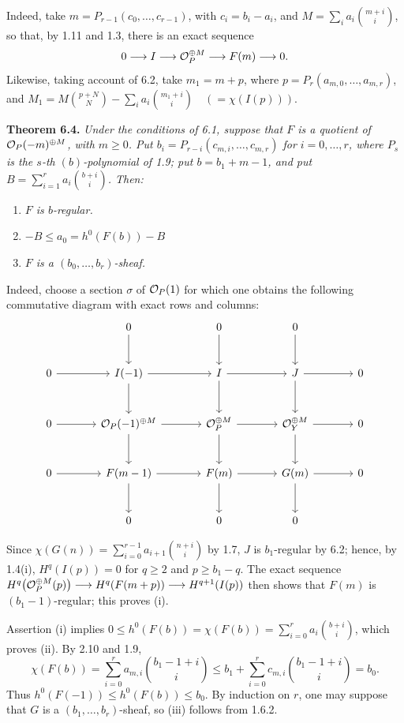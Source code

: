 Indeed, take $m=P_{r-1}(c_0,\ldots,c_{r-1})$, with $c_i=b_i-a_i$,
and $M=\sum_i a_i\binom{m+i}{i}$, so that, by 1.11 and 1.3, there is
an exact sequence
\[
  0\longrightarrow I\longrightarrow\mathcal O_P^{\oplus M}
  \longrightarrow F(m)\longrightarrow0.
\]
Likewise, taking account of 6.2, take $m_1=m+p$, where
$p=P_r(a_{m,0},\ldots,a_{m,r})$, and
$M_1=M\binom{p+N}{N}-\sum_i a_i\binom{m_1+i}{i}
\quad(=\chi(I(p)))$.

\textbf{Theorem 6.4.} \emph{Under the conditions of 6.1, suppose that
$F$ is a quotient of $\mathcal O_P(-m)^{\oplus M}$, with $m\geq0$. Put
$b_i=P_{r-i}(c_{m,i},\ldots,c_{m,r})$ for $i=0,\ldots,r$, where $P_s$
is the $s$-th $(b)$-polynomial of 1.9; put $b=b_1+m-1$, and put
$B=\sum_{i=1}^{r}a_i\binom{b+i}{i}$. Then:}
\begin{enumerate}[label=(\roman*)]
\item \emph{$F$ is $b$-regular.}
\item \emph{$-B\leq a_0=h^0(F(b))-B$}
\item \emph{$F$ is a $(b_0,\ldots,b_r)$-sheaf.}
\end{enumerate}

Indeed, choose a section $\sigma$ of $\mathcal O_P(1)$ for which one obtains the following commutative diagram with exact rows and columns:
\[
\begin{tikzcd}[column sep=large,row sep=large]
&0 \arrow[d]&0 \arrow[d]&0 \arrow[d]&\\
0 \arrow[r]&I(-1) \arrow[r] \arrow[d]&I \arrow[r] \arrow[d]&J \arrow[r] \arrow[d]&0\\
0 \arrow[r]&\cO_P(-1)^{\oplus M} \arrow[r] \arrow[d]&\cO_P^{\oplus M} \arrow[r] \arrow[d]&\cO_Y^{\oplus M} \arrow[r] \arrow[d]&0\\
0 \arrow[r]&F(m-1) \arrow[r] \arrow[d]&F(m) \arrow[r] \arrow[d]&G(m) \arrow[r] \arrow[d]&0\\
&0&0&0&
\end{tikzcd}
\]

Since $\chi(G(n))=\sum_{i=0}^{r-1}a_{i+1}\binom{n+i}{i}$ by 1.7,
$J$ is $b_1$-regular by 6.2; hence, by 1.4(i), $H^q(I(p))=0$ for
$q\geq2$ and $p\geq b_1-q$. The exact sequence
$H^q\bigl(\mathcal O_P^{\oplus M}(p)\bigr)\longrightarrow
H^q(F(m+p))\longrightarrow H^{q+1}(I(p))$ then shows that $F(m)$ is
$(b_1-1)$-regular; this proves (i).

Assertion (i) implies
$0\leq h^0(F(b))=\chi(F(b))
=\sum_{i=0}^{r}a_i\binom{b+i}{i}$, which proves (ii). By 2.10 and 1.9,
\[
  \chi(F(b))
  =\sum_{i=0}^{r}a_{m,i}\binom{b_1-1+i}{i}
  \leq b_1+\sum_{i=0}^{r}c_{m,i}\binom{b_1-1+i}{i}
  =b_0.
\]
Thus $h^0(F(-1))\leq h^0(F(b))\leq b_0$. By induction on $r$, one may suppose that $G$ is a $(b_1,\ldots,b_r)$-sheaf, so (iii) follows from 1.6.2.

